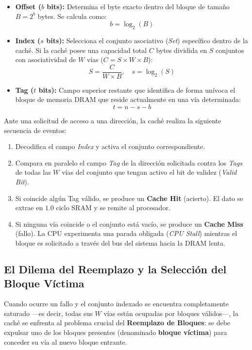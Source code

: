 \documentclass[11pt,letterpaper]{article}
\begin{document}
\begin{itemize}
    \item \textbf{Offset ($b$ bits):} Determina el byte exacto dentro del bloque de tamaño $B = 2^b$ bytes. Se calcula como:
    \begin{equation}
        b = \log_2(B)
    \end{equation}
    \item \textbf{Index ($s$ bits):} Selecciona el conjunto asociativo (\textit{Set}) específico dentro de la caché. Si la caché posee una capacidad total $C$ bytes dividida en $S$ conjuntos con asociatividad de $W$ vías ($C = S \times W \times B$):
    \begin{equation}
        S = \frac{C}{W \times B}, \quad s = \log_2(S)
    \end{equation}
    \item \textbf{Tag ($t$ bits):} Campo superior restante que identifica de forma unívoca el bloque de memoria DRAM que reside actualmente en una vía determinada:
    \begin{equation}
        t = n - s - b
    \end{equation}
\end{itemize}

Ante una solicitud de acceso a una dirección, la caché realiza la siguiente secuencia de eventos:
\begin{enumerate}
    \item Decodifica el campo \textit{Index} y activa el conjunto correspondiente.
    \item Compara en paralelo el campo \textit{Tag} de la dirección solicitada contra los \textit{Tags} de todas las $W$ vías del conjunto que tengan activo el bit de validez (\textit{Valid Bit}).
    \item Si coincide algún Tag válido, se produce un \textbf{Cache Hit} (acierto). El dato se extrae en $1.0$ ciclo SRAM y se remite al procesador.
    \item Si ninguna vía coincide o el conjunto está vacío, se produce un \textbf{Cache Miss} (fallo). La CPU experimenta una parada obligada (\textit{CPU Stall}) mientras el bloque es solicitado a través del bus del sistema hacia la DRAM lenta.
\end{enumerate}

\subsection{El Dilema del Reemplazo y la Selección del Bloque Víctima}
Cuando ocurre un fallo y el conjunto indexado se encuentra completamente saturado —es decir, todas sus $W$ vías están ocupadas por bloques válidos—, la caché se enfrenta al problema crucial del \textbf{Reemplazo de Bloques}: se debe expulsar uno de los bloques presentes (denominado \textbf{bloque víctima}) para conceder su vía al nuevo bloque entrante.
\end{document}
